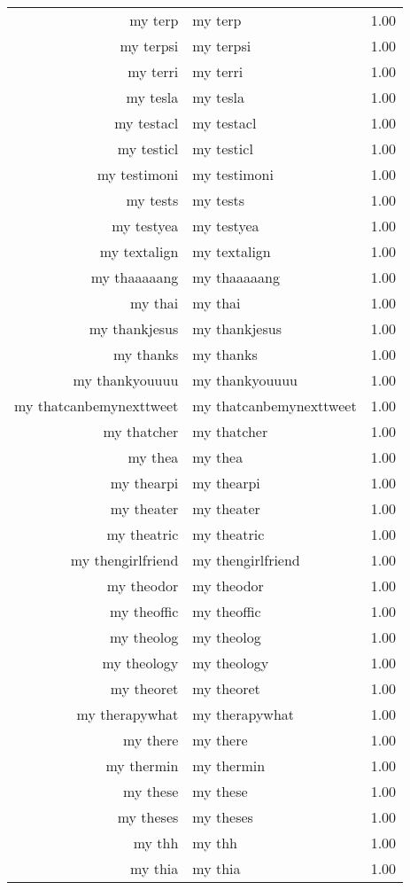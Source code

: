 \begin{table}[ht]
\begin{tabular}{rlr}
  my terp & my terp & 1.00 \\ 
  my terpsi & my terpsi & 1.00 \\ 
  my terri & my terri & 1.00 \\ 
  my tesla & my tesla & 1.00 \\ 
  my testacl & my testacl & 1.00 \\ 
  my testicl & my testicl & 1.00 \\ 
  my testimoni & my testimoni & 1.00 \\ 
  my tests & my tests & 1.00 \\ 
  my testyea & my testyea & 1.00 \\ 
  my textalign & my textalign & 1.00 \\ 
  my thaaaaang & my thaaaaang & 1.00 \\ 
  my thai & my thai & 1.00 \\ 
  my thankjesus & my thankjesus & 1.00 \\ 
  my thanks & my thanks & 1.00 \\ 
  my thankyouuuu & my thankyouuuu & 1.00 \\ 
  my thatcanbemynexttweet & my thatcanbemynexttweet & 1.00 \\ 
  my thatcher & my thatcher & 1.00 \\ 
  my thea & my thea & 1.00 \\ 
  my thearpi & my thearpi & 1.00 \\ 
  my theater & my theater & 1.00 \\ 
  my theatric & my theatric & 1.00 \\ 
  my thengirlfriend & my thengirlfriend & 1.00 \\ 
  my theodor & my theodor & 1.00 \\ 
  my theoffic & my theoffic & 1.00 \\ 
  my theolog & my theolog & 1.00 \\ 
  my theology & my theology & 1.00 \\ 
  my theoret & my theoret & 1.00 \\ 
  my therapywhat & my therapywhat & 1.00 \\ 
  my there & my there & 1.00 \\ 
  my thermin & my thermin & 1.00 \\ 
  my these & my these & 1.00 \\ 
  my theses & my theses & 1.00 \\ 
  my thh & my thh & 1.00 \\ 
  my thia & my thia & 1.00 \\ 

\end{tabular}
\end{table}
